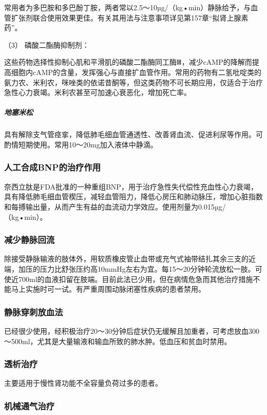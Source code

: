 常用者为多巴胺和多巴酚丁胺，两者常以2.5～10µg/（kg•min）静脉给予，与血管扩张剂联合使用效果更佳。有关其用法与注意事项详见第157章“拟肾上腺素药”。

\hypertarget{text00070.htmlux5cux23CHP3-2-4-3-5-3}{}
（3） 磷酸二酯酶抑制剂：

这些药物选择性抑制心肌和平滑肌的磷酸二酯酶同工酶Ⅲ，减少cAMP的降解而提高细胞内cAMP的含量，发挥强心与直接扩血管作用。常用的药物有二氢吡啶类的氨力农、米利农，咪唑类的依诺昔酮等，但这类药物不可长期应用，仅适合于治疗急性心力衰竭。米利农甚至可加速心衰恶化，增加死亡率。

\subparagraph{地塞米松}

具有解除支气管痉挛，降低肺毛细血管通透性、改善肾血流、促进利尿等作用。可酌情短期使用。常用10～20mg加入液体中静滴。

\subsubsection{人工合成BNP的治疗作用}

奈西立肽是FDA批准的一种重组BNP，用于治疗急性失代偿性充血性心力衰竭，具有降低肺毛细血管楔压，减轻血管阻力，降低心房压和肺动脉压，增加心脏指数和每搏输出量，从而产生有益的血流动力学效应。使用剂量为0.015µg/（kg•min）。

\subsubsection{减少静脉回流}

除接受静脉输液的肢体外，用软质橡皮管止血带或充气式袖带结扎其余三支的近端，加压的压力比舒张压约高10mmHg左右为宜。每15～20分钟轮流放松一肢。可使近700ml的血液扣留在肢端。目前此法已少用，但在病情危急而其他治疗措施不能马上实施时可一试。有严重周围动脉闭塞性疾病的患者禁用。

\subsubsection{静脉穿刺放血法}

已经很少使用，经积极治疗20～30分钟后症状仍无缓解且加重者，可考虑放血300～500ml，尤其是大量输液和输血所致的肺水肿。低血压和贫血时禁用。

\subsubsection{透析治疗}

主要适用于慢性肾功能不全容量负荷过多的患者。

\subsubsection{机械通气治疗}

